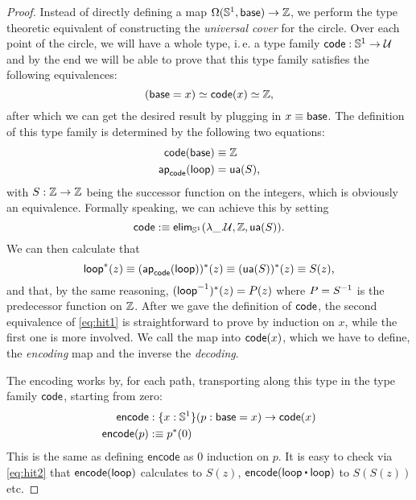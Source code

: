 \begin{proof}
Instead of directly defining a map $\Omega(\mathbb{S}^1, \mathsf{base}) \to \mathbb Z$,
we perform the type theoretic equivalent of constructing the
\emph{universal cover} for the circle.
Over each point of the circle, we will have a whole type, i.\,e. a type family
$\mathsf{code} : \mathbb{S}^1 \to \mathcal{U}$
and by the end we will be able to prove that this type family satisfies the
following equivalences:
\begin{equation}\label{eq:hit1}
(\mathsf{base} = x) \simeq \mathsf{code}(x) \simeq \mathbb Z \text{,}
\end{equation}
after which we can get the desired result by plugging in $x \equiv \mathsf{base}$.
The definition of this type family is determined by the following two equations:
\begin{align*}
\mathsf{code}(\mathsf{base}) &\equiv \mathbb Z \\
\mathsf{ap}_{\mathsf{code}}(\mathsf{loop}) &= \mathsf{ua}(S) \text{,}
\end{align*}
with $S : \mathbb Z \to \mathbb Z$ being the successor function on the integers, which
is obviously an equivalence.
Formally speaking, we can achieve this by setting
\begin{equation*}
\mathsf{code} :\equiv \mathsf{elim}_{\mathbb{S}^1}(\lambda \_.\mathcal{U}, \mathbb Z, \mathsf{ua}(S)) \text{.}
\end{equation*}
We can then calculate that
\begin{equation}\label{eq:hit2}
\mathsf{loop}^*(z) \equiv (\mathsf{ap}_{\mathsf{code}}(\mathsf{loop}))^*(z) \equiv (\mathsf{ua}(S))^*(z) \equiv S(z) \text{,}
\end{equation}
and that, by the same reasoning, $(\mathsf{loop}^{-1})^*(z) = P(z)$ where
$P = S^{-1}$ is the predecessor function on $\mathbb Z$.
After we gave the definition of $\mathsf{code}$, the second equivalence of \eqref{eq:hit1}
is straightforward to prove by induction on $x$, while the first one is more involved.
We call the map into $\mathsf{code}(x)$, which we have to define,
the \emph{encoding} map and the inverse the \emph{decoding}.

The encoding works by, for each path, transporting along this type in the type
family $\mathsf{code}$, starting from zero:
\begin{align*}
\mathsf{encode} &: \{x : \mathbb{S}^1\}(p : \mathsf{base} = x) \to \mathsf{code}(x) \\
\mathsf{encode}(p) &:\equiv p^*(0)
\end{align*}
This is the same as defining $\mathsf{encode}$ as $0$ induction on $p$.
It is easy to check via \eqref{eq:hit2} that $\mathsf{encode}(\mathsf{loop})$
calculates to $S(z)$, $\mathsf{encode}(\Sloop \ct \Sloop)$ to
$S(S(z))$ etc.


\end{proof}
